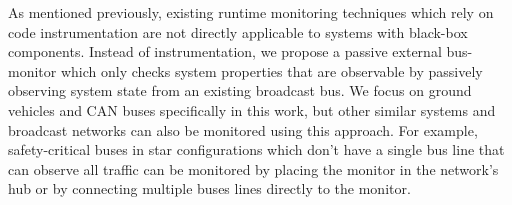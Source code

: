 
As mentioned previously, existing runtime monitoring techniques which rely on code instrumentation are not directly applicable to systems with black-box components.
Instead of instrumentation, we propose a passive external bus-monitor which only checks system properties that are observable by passively observing system state from an existing broadcast bus.
We focus on ground vehicles and CAN buses specifically in this work, but other similar systems and broadcast networks can also be monitored using this approach.
For example, safety-critical buses in star configurations which don't have a single bus line that can observe all traffic can be monitored by placing the monitor in the network's hub or by connecting multiple buses lines directly to the monitor.



